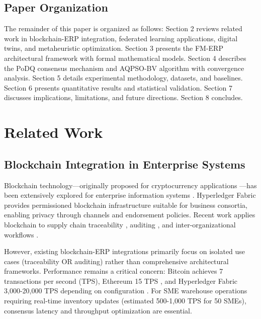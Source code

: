 \documentclass[times,10pt,twocolumn]{jucs2e}
\begin{document}
\subsection{Paper Organization}

The remainder of this paper is organized as follows: Section 2 reviews related work in blockchain-ERP integration, federated learning applications, digital twins, and metaheuristic optimization. Section 3 presents the FM-ERP architectural framework with formal mathematical models. Section 4 describes the PoDQ consensus mechanism and AQPSO-BV algorithm with convergence analysis. Section 5 details experimental methodology, datasets, and baselines. Section 6 presents quantitative results and statistical validation. Section 7 discusses implications, limitations, and future directions. Section 8 concludes.


\section{Related Work}

\subsection{Blockchain Integration in Enterprise Systems}

Blockchain technology---originally proposed for cryptocurrency applications \cite{Nakamoto2008}---has been extensively explored for enterprise information systems \cite{Wang2023}. Hyperledger Fabric \cite{Androulaki2018} provides permissioned blockchain infrastructure suitable for business consortia, enabling privacy through channels and endorsement policies. Recent work applies blockchain to supply chain traceability \cite{Kumar2022}, auditing \cite{Zhang2024}, and inter-organizational workflows \cite{Chen2023}.

However, existing blockchain-ERP integrations primarily focus on isolated use cases (traceability OR auditing) rather than comprehensive architectural frameworks. Performance remains a critical concern: Bitcoin achieves 7 transactions per second (TPS), Ethereum 15 TPS \cite{Gervais2016}, and Hyperledger Fabric 3,000-20,000 TPS depending on configuration \cite{Thakkar2018}. For SME warehouse operations requiring real-time inventory updates (estimated 500-1,000 TPS for 50 SMEs), consensus latency and throughput optimization are essential.
\end{document}

